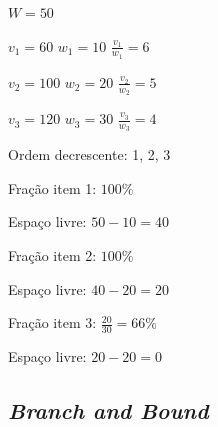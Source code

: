 \begin{example}
    \begin{multicols}{2}

        $W = 50$

        $v_1 = 60$ \hspace{10pt} $w_1 = 10$ \hspace{10pt} $\frac{v_1}{w_1} = 6$

        $v_2 = 100$ \hspace{10pt} $w_2 = 20$ \hspace{10pt} $\frac{v_2}{w_2} = 5$

        $v_3 = 120$ \hspace{10pt} $w_3 = 30$ \hspace{10pt} $\frac{v_3}{w_3} = 4$

        \columnbreak

        Ordem decrescente: 1, 2, 3

        Fração item 1: $100\%$

        Espaço livre: $50 - 10 = 40$

        Fração item 2: $100\%$

        Espaço livre: $40 - 20 = 20$

        Fração item 3: $\frac{20}{30} = 66\%$

        Espaço livre: $20 - 20 = 0$
    \end{multicols}
\end{example}

\begin{algorithm}
    \SetAlgoLined

\end{algorithm}

\subsection{\textit{Branch and Bound}}

